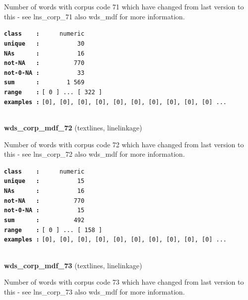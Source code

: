 \documentclass[]{article}
\begin{document}
Number of words with corpus code 71 which have changed from last version
to this - see lns\_corp\_71 also wds\_mdf for more information.

\textbf{\texttt{class\ \ \ \ :}} \texttt{~~~~~numeric}\\
\textbf{\texttt{unique\ \ \ :}} \texttt{~~~~~~~~~~30}\\
\textbf{\texttt{NAs\ \ \ \ \ \ :}} \texttt{~~~~~~~~~~16}\\
\textbf{\texttt{not-NA\ \ \ :}} \texttt{~~~~~~~~~770}\\
\textbf{\texttt{not-0-NA\ :}} \texttt{~~~~~~~~~~33}\\
\textbf{\texttt{sum\ \ \ \ \ \ :}} \texttt{~~~~~~~1~569}\\
\textbf{\texttt{range\ \ \ \ :}}
\texttt{{[}\ 0\ {]}\ ...\ {[}\ 322\ {]}}\\
\textbf{\texttt{examples\ :}}
\texttt{{[}0{]},\ {[}0{]},\ {[}0{]},\ {[}0{]},\ {[}0{]},\ {[}0{]},\ {[}0{]},\ {[}0{]},\ {[}0{]},\ {[}0{]}\ ...}\\

~

\textbf{wds\_corp\_mdf\_72} (textlines, linelinkage)

Number of words with corpus code 72 which have changed from last version
to this - see lns\_corp\_72 also wds\_mdf for more information.

\textbf{\texttt{class\ \ \ \ :}} \texttt{~~~~~numeric}\\
\textbf{\texttt{unique\ \ \ :}} \texttt{~~~~~~~~~~15}\\
\textbf{\texttt{NAs\ \ \ \ \ \ :}} \texttt{~~~~~~~~~~16}\\
\textbf{\texttt{not-NA\ \ \ :}} \texttt{~~~~~~~~~770}\\
\textbf{\texttt{not-0-NA\ :}} \texttt{~~~~~~~~~~15}\\
\textbf{\texttt{sum\ \ \ \ \ \ :}} \texttt{~~~~~~~~~492}\\
\textbf{\texttt{range\ \ \ \ :}}
\texttt{{[}\ 0\ {]}\ ...\ {[}\ 158\ {]}}\\
\textbf{\texttt{examples\ :}}
\texttt{{[}0{]},\ {[}0{]},\ {[}0{]},\ {[}0{]},\ {[}0{]},\ {[}0{]},\ {[}0{]},\ {[}0{]},\ {[}0{]},\ {[}0{]}\ ...}\\

~

\textbf{wds\_corp\_mdf\_73} (textlines, linelinkage)

Number of words with corpus code 73 which have changed from last version
to this - see lns\_corp\_73 also wds\_mdf for more information.
\end{document}
